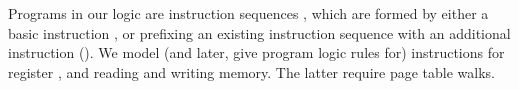 \label{sec:instructions}


Programs in our logic are instruction sequences \instrs, which are formed by either a basic instruction \iskip, or prefixing an existing instruction
sequence with an additional instruction (\iseq\instr\instrs).
We model (and later, give program logic rules for) instructions for  register , and reading and writing memory.
The latter require page table walks.


